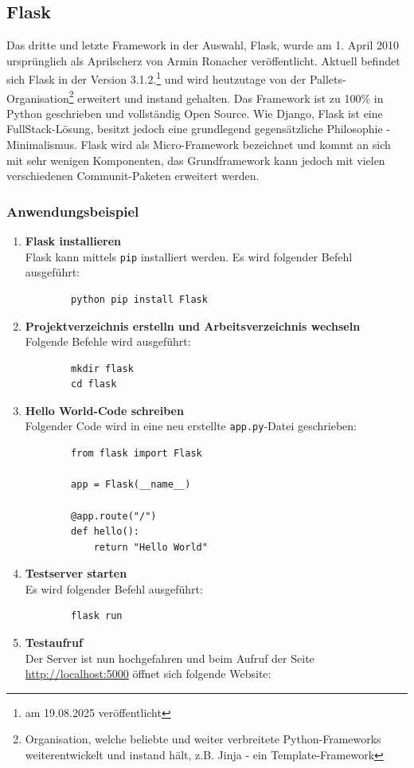 \documentclass[letterpaper,11pt,leqno]{article}
\begin{document}
\subsection{Flask}
Das dritte und letzte Framework in der Auswahl, Flask, wurde am 1. April 2010 ursprünglich als Aprilscherz von Armin Ronacher
veröffentlicht. Aktuell befindet sich Flask in der Version 3.1.2.\footnote{am 19.08.2025 veröffentlicht} und wird heutzutage von der
Pallets-Organisation\footnote{ Organisation, welche beliebte und weiter verbreitete Python-Frameworks weiterentwickelt und instand
hält, z.B. Jinja - ein Template-Framework} erweitert und instand gehalten. Das Framework ist zu 100\% in Python geschrieben und
vollständig Open Source. Wie Django, Flask ist eine FullStack-Lösung, besitzt jedoch eine grundlegend gegensätzliche Philosophie -
Minimalismus. Flask wird als Micro-Framework bezeichnet und kommt an sich mit sehr wenigen Komponenten, das Grundframework kann
jedoch mit vielen verschiedenen Communit-Paketen erweitert werden.

\subsubsection{Anwendungsbeispiel}
\begin{enumerate}
	\item\textbf{Flask installieren}\\Flask kann mittels \verb|pip| installiert werden. Es wird folgender Befehl ausgeführt:
	\begin{verbatim}
		python pip install Flask
	\end{verbatim}
	\item\textbf{Projektverzeichnis erstelln und Arbeitsverzeichnis wechseln}\\Folgende Befehle wird ausgeführt:
	\begin{verbatim}
		mkdir flask
		cd flask
	\end{verbatim}
	\item\textbf{Hello World-Code schreiben}\\Folgender Code wird in eine neu erstellte \verb|app.py|-Datei geschrieben:
	\begin{verbatim}
		from flask import Flask

		app = Flask(__name__)

		@app.route("/")
		def hello():
			return "Hello World"
	\end{verbatim}
	\item\textbf{Testserver starten}\\Es wird folgender Befehl ausgeführt:
	\begin{verbatim}
		flask run
	\end{verbatim}
	\item\textbf{Testaufruf}\\Der Server ist nun hochgefahren und beim Aufruf der Seite \url{http://localhost:5000} öffnet sich
	folgende Website:
\end{enumerate}
\end{document}
